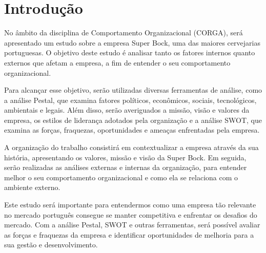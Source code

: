 \chapter{Introdução}

No âmbito da disciplina de Comportamento Organizacional (CORGA), será apresentado um estudo sobre a empresa Super Bock, uma das maiores cervejarias portuguesas. O objetivo deste estudo é analisar tanto os fatores internos quanto externos que afetam a empresa, a fim de entender o seu comportamento organizacional.



Para alcançar esse objetivo, serão utilizadas diversas ferramentas de análise, como a análise Pestal, que examina fatores políticos, econômicos, sociais, tecnológicos, ambientais e legais. Além disso, serão averiguados a missão, visão e valores da empresa, os estilos de liderança adotados pela organização e a análise SWOT, que examina as forças, fraquezas, oportunidades e ameaças enfrentadas pela empresa.



A organização do trabalho consistirá em contextualizar a empresa através da sua história, apresentando os valores, missão e visão da Super Bock. Em seguida, serão realizadas as análises externas e internas da organização, para entender melhor o seu comportamento organizacional e como ela se relaciona com o ambiente externo.



Este estudo será importante para entendermos como uma empresa tão relevante no mercado português consegue se manter competitiva e enfrentar os desafios do mercado. Com a análise Pestal, SWOT e outras ferramentas, será possível avaliar as forças e fraquezas da empresa e identificar oportunidades de melhoria para a sua gestão e desenvolvimento.